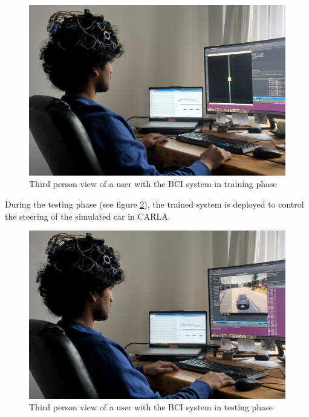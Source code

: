      \begin{figure}[H]
        \begin{center}
        \includegraphics[width=1.0\textwidth]{images/exp_third_person_view2.png}
        \caption{Third person view of a user with the BCI system in training phase}
        \label{fig:exp_third_person_view2}
        \end{center}
    \end{figure}

During the testing phase (see figure \ref{fig:exp_third_person_carla1}), the trained system is deployed to control the steering of the simulated car in CARLA.

     \begin{figure}[H]
        \begin{center}
        \includegraphics[width=1.0\textwidth]{images/exp_third_person_carla1.png}
        \caption{Third person view of a user with the BCI system in testing phase}
        \label{fig:exp_third_person_carla1}
        \end{center}
    \end{figure}

